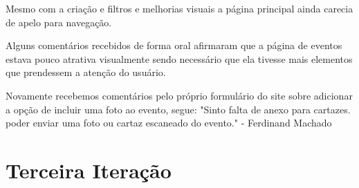 \par Mesmo com a criação e filtros e melhorias visuais a página principal ainda carecia de apelo para navegação. 
\par Alguns comentários recebidos de forma oral afirmaram que a página de eventos estava pouco atrativa visualmente sendo necessário que ela tivesse mais elementos que prendessem a atenção do usuário. 

\par Novamente recebemos comentários pelo próprio formulário do site sobre adicionar a opção de incluir uma foto ao evento, segue: "Sinto falta de anexo para cartazes. poder enviar uma foto ou cartaz escaneado do evento." - Ferdinand Machado

\section{Terceira Iteração}
